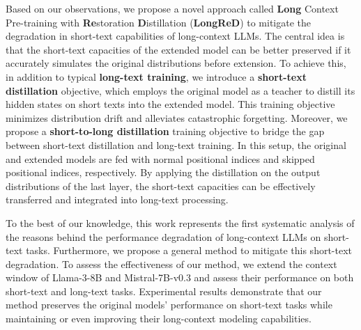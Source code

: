 
Based on our observations, we propose a novel approach called \textbf{Long} Context Pre-training with \textbf{Re}storation \textbf{D}istillation (\textbf{LongReD}) to mitigate the degradation in short-text capabilities of long-context LLMs. The central idea is that the short-text capacities of the extended model can be better preserved if it accurately simulates the original distributions before extension. To achieve this, in addition to typical \textbf{long-text training}, we introduce a \textbf{short-text distillation} objective, which employs the original model as a teacher to distill its hidden states on short texts into the extended model. This training objective minimizes distribution drift and alleviates catastrophic forgetting.
Moreover, we propose a \textbf{short-to-long distillation} training objective to bridge the gap between short-text distillation and long-text training. In this setup, the original and extended models are fed with normal positional indices and skipped positional indices, respectively. 
By applying the distillation on the output distributions of the last layer, the short-text capacities can be effectively transferred and integrated into long-text processing.


To the best of our knowledge, this work represents the first systematic analysis of the reasons behind the performance degradation of long-context LLMs on short-text tasks. Furthermore, we propose a general method to mitigate this short-text degradation. To assess the effectiveness of our method, we extend the context window of Llama-3-8B and Mistral-7B-v0.3 and assess their performance on both short-text and long-text tasks. Experimental results demonstrate that our method preserves the original models' performance on short-text tasks while maintaining or even improving their long-context modeling capabilities.



